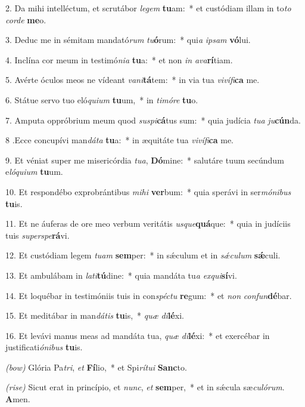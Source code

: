 2. Da mihi intelléctum, et scrutábor \textit{le}\textit{gem} \textbf{tu}am:~* et custódiam illam in to\textit{to} \textit{cor}\textit{de} \textbf{me}o.

3. Deduc me in sémitam mandató\textit{rum} \textit{tu}\textbf{ó}rum:~* qui\textit{a} \textit{ip}\textit{sam} \textbf{vó}lui.

4. Inclína cor meum in testimó\textit{ni}\textit{a} \textbf{tu}a:~* et non \textit{in} \textit{a}\textit{va}\textbf{rí}tiam.

5. Avérte óculos meos ne vídeant \textit{va}\textit{ni}\textbf{tá}tem:~* in via tua \textit{vi}\textit{ví}\textit{fi}\textbf{ca} me.

6. Státue servo tuo eló\textit{qui}\textit{um} \textbf{tu}um,~* in \textit{ti}\textit{mó}\textit{re} \textbf{tu}o.

7. Amputa oppróbrium meum quod \textit{su}\textit{spi}\textbf{cá}tus sum:~* quia judícia \textit{tu}\textit{a} \textit{ju}\textbf{cún}da.

8 .Ecce concupívi man\textit{dá}\textit{ta} \textbf{tu}a:~* in æquitáte tua \textit{vi}\textit{ví}\textit{fi}\textbf{ca} me.

9. Et véniat super me misericórdia \textit{tu}\textit{a}, \textbf{Dó}mine:~* salutáre tuum secúndum e\textit{ló}\textit{qui}\textit{um} \textbf{tu}um.

10. Et respondébo exprobrántibus \textit{mi}\textit{hi} \textbf{ver}bum:~* quia sperávi in ser\textit{mó}\textit{ni}\textit{bus} \textbf{tu}is.

11. Et ne áuferas de ore meo verbum veritátis \textit{us}\textit{que}\textbf{quá}que:~* quia in judíciis tuis \textit{su}\textit{per}\textit{spe}\textbf{rá}vi.

12. Et custódiam legem \textit{tu}\textit{am} \textbf{sem}per:~* in s\'{\ae}culum et in \textit{s\'{\ae}}\textit{cu}\textit{lum} \textbf{s\'{\ae}}culi.

13. Et ambulábam in \textit{la}\textit{ti}\textbf{tú}dine:~* quia mandáta tu\textit{a} \textit{ex}\textit{qui}\textbf{sí}vi.

14. Et loquébar in testimóniis tuis in con\textit{spéc}\textit{tu} \textbf{re}gum:~* et \textit{non} \textit{con}\textit{fun}\textbf{dé}bar.

15. Et meditábar in man\textit{dá}\textit{tis} \textbf{tu}is,~* \textit{quæ} \textit{di}\textbf{lé}xi.

16. Et levávi manus meas ad mandáta tua, \textit{quæ} \textit{di}\textbf{lé}xi:~* et exercébar in justificati\textit{ó}\textit{ni}\textit{bus} \textbf{tu}is.

{\color{red}\textit{(bow)}} Glória Pa\textit{tri}, \textit{et} \textbf{Fí}lio,~* et Spi\textit{rí}\textit{tu}\textit{i} \textbf{Sanc}to.

{\color{red}\textit{(rise)}} Sicut erat in princípio, et \textit{nunc}, \textit{et} \textbf{sem}per,~* et in s\'{\ae}cula sæ\textit{cu}\textit{ló}\textit{rum}. \textbf{A}men.